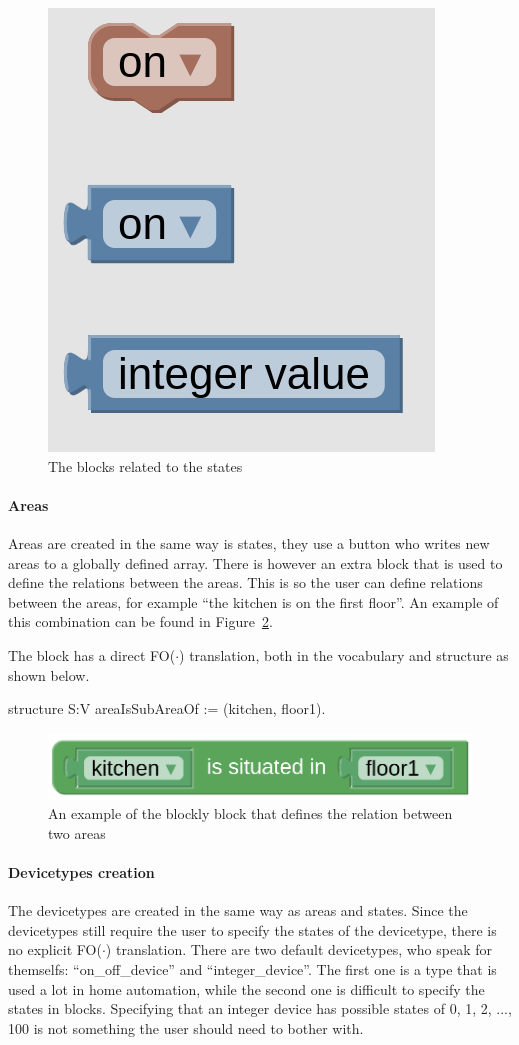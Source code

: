 \documentclass[11pt,a4paper]{report}
\newcommand{\fodot}{FO($\cdot$)\xspace}
\begin{document}
\begin{figure}
    \centering
    \includegraphics[width=0.2\linewidth]{images/homy_state_blocks.png}
    \caption{The blocks related to the states}
    \label{fig:homy_state_blocks}
\end{figure}

\paragraph{Areas}
Areas are created in the same way is states, they use a button who writes new areas to a globally defined array. There is however an extra block that is used to define the relations between the areas. This is so the user can define relations between the areas, for example ``the kitchen is on the first floor''. An example of this combination can be found in Figure~\ref{fig:homy_area_relation}.

The block has a direct \fodot translation, both in the vocabulary and structure as shown below. 
\begin{idplisting}
structure S:V {
    areaIsSubAreaOf := {(kitchen, floor1)}.
}
\end{idplisting}

\begin{figure}
    \centering
    \includegraphics[width=0.8\linewidth]{images/homy_area_relation.png}
    \caption{An example of the blockly block that defines the relation between two areas}
    \label{fig:homy_area_relation}
\end{figure}

\paragraph{Devicetypes creation}
The devicetypes are created in the same way as areas and states. Since the devicetypes still require the user to specify the states of the devicetype, there is no explicit \fodot translation. There are two default devicetypes, who speak for themselfs: ``on\_off\_device'' and ``integer\_device''. The first one is a type that is used a lot in home automation, while the second one is difficult to specify the states in blocks. Specifying that an integer device has possible states of 0, 1, 2, ..., 100 is not something the user should need to bother with.
\end{document}
